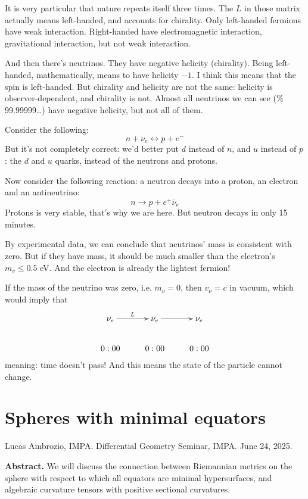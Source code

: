 \medskip

It is very particular that nature repeats itself three times. The $L$ in those
matrix actually means left-handed, and accounts for chirality. Only left-handed
fermions have weak interaction. Right-handed have electromagnetic interaction,
gravitational interaction, but not weak interaction.

And then there's neutrinos. They have negative helicity (chirality). Being
left-handed, mathematically, means to have helicity $-1$. I think this means
that the spin is left-handed. But chirality and helicity are not the same:
helicity is observer-dependent, and chirality is not. Almost all neutrinos we
can see (\% 99.99999…) have negative helicity, but not all of them.

Consider the following:
$$
n+\nu_e\leftrightarrow p+e^-
$$
But it's not completely correct: we'd better put $d$ instead of $n$, and $u$
instead of $p$: the $d$ and $u$ quarks, instead of the neutrons and protons.

Now consider the following reaction: a neutron decays into a proton, an electron
and an antineutrino:
$$
n\to p+e^+\overline{\nu}_e
$$
Protons is very stable, that's why we are here. But neutron decays in only 15
minutes.

By experimental data, we can conclude that neutrinos' mass is consistent with
zero. But if they have mass, it should be much smaller than the electron's $m_v
\leq 0.5$ eV. And the electron is already the lightest fermion!

If the mass of the neutrino was zero, i.e. $m_\nu=0$, then $v_\nu=c$ in vacuum,
which would imply that 
$$
\xymatrix{
\nu_e\ar[r]^{L}&\nu_e\ar[r]&\nu_e\\
0:00&0:00&0:00
}
$$
meaning: time doesn't pass! And this means the state of the particle cannot
change.



\section{Spheres with minimal equators}
\label{section-spheres-with-minimal-equators}

\noindent
Lucas Ambrozio, IMPA.
Differential Geometry Seminar, IMPA. 
June 24, 2025.

\medskip
{\bf Abstract.} We will discuss the connection between Riemannian metrics on the
sphere with respect to which all equators are minimal hypersurfaces, and
algebraic curvature tensors with positive sectional curvatures.

